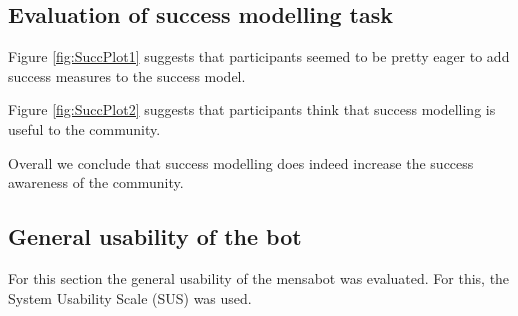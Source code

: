 \subsection{Evaluation of success modelling task}
Figure \ref{fig:SuccPlot1} suggests that participants seemed to be pretty eager to add success measures to the success model.


Figure \ref{fig:SuccPlot2} suggests that participants think that success modelling is useful to the community.

Overall we conclude that success modelling does indeed increase the success awareness of the community. 

\subsection{General usability of the bot}
For this section the general usability of the mensabot was evaluated. For this, the System Usability Scale (SUS) was used.
